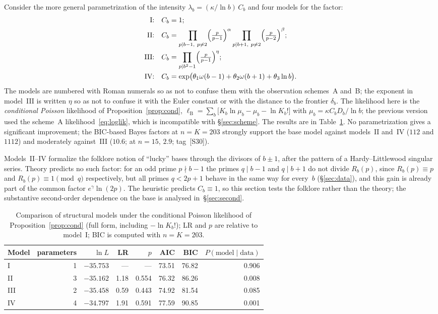 \documentclass[11pt,a4paper]{article}
\theoremstyle{plain}
\theoremstyle{remark}
\newcommand{\Rb}{R_b}
\newcommand{\eg}{e^{\gamma}}
\begin{document}
Consider the more general parametrization of the intensity
$\lambda_b=(\kappa/\ln b)\,C_b$ and four models for the factor:
\begin{align*}
\text{I:}&\quad C_b=1;\\
\text{II:}&\quad C_b=\prod_{p\mid b-1,\ p\ne2}\Bigl(\tfrac{p}{p-1}\Bigr)^{\alpha}
                 \prod_{p\mid b+1,\ p\ne2}\Bigl(\tfrac{p}{p-2}\Bigr)^{\beta};\\
\text{III:}&\quad C_b=\prod_{p\mid b^2-1}\Bigl(\tfrac{p}{p-1}\Bigr)^{\eta};\\
\text{IV:}&\quad C_b=\exp\bigl(\theta_1\omega(b-1)+\theta_2\omega(b+1)+\theta_3\ln b\bigr).
\end{align*}
The models are numbered with Roman numerals so as not to confuse them with the
observation schemes~A and~B; the exponent in model~III is written $\eta$ so as
not to confuse it with the Euler constant or with the distance to the frontier
$\delta_b$. The likelihood here is the \emph{conditional
Poisson} likelihood of Proposition~\ref{prop:cond},
$\ell_{\mathrm B}=\sum_b\bigl[K_b\ln\mu_b-\mu_b-\ln K_b!\bigr]$ with
$\mu_b=\kappa C_b D_b/\ln b$; the previous version used the scheme~A
likelihood~\eqref{eq:loglik}, which is incompatible with \S\ref{sec:scheme}. The
results are in Table~\ref{tab:struct}. No parametrization gives a significant
improvement; the BIC-based Bayes factors at $n=K=203$ strongly support the base
model against models~II and~IV ($112$ and $1112$) and moderately against~III
($10.6$; at $n=15$, $2.9$; tag~[S30]).

Models~II--IV formalize the folklore notion of ``lucky'' bases through the
divisors of $b\pm1$, after the pattern of a Hardy--Littlewood singular series.
Theory predicts no such factor: for an odd prime $p\nmid b-1$ the primes
$q\mid b-1$ and $q\mid b+1$ do not divide $\Rb(p)$, since $\Rb(p)\equiv p$ and $\Rb(p)\equiv1\pmod q$ respectively, but all
primes $q<2p+1$ behave in the same way for every~$b$ (\S\ref{sec:data}), and this
gain is already part of the common factor $\eg\ln(2p)$. The heuristic predicts
$C_b\equiv1$, so this section tests the folklore rather than the theory; the
substantive second-order dependence on the base is analysed
in~\S\ref{sec:second}.

\begin{table}[t]
\centering
\caption{Comparison of structural models under the conditional Poisson likelihood of
Proposition~\ref{prop:cond} (full form, including $-\ln K_b!$); LR and $p$ are
relative to model~I; BIC is computed with $n=K=203$.}
\label{tab:struct}
\small
\begin{tabular}{lrrrrrrr}
\toprule
Model & parameters & $\ln L$ & LR & $p$ & AIC & BIC & $P(\text{model}\mid\text{data})$\\
\midrule
I & 1 & $-35.753$ & --- & --- & 73.51 & 76.82 & 0.906\\
II & 3 & $-35.162$ & 1.18 & 0.554 & 76.32 & 86.26 & 0.008\\
III & 2 & $-35.458$ & 0.59 & 0.443 & 74.92 & 81.54 & 0.085\\
IV & 4 & $-34.797$ & 1.91 & 0.591 & 77.59 & 90.85 & 0.001\\
\bottomrule
\end{tabular}
\end{table}
\end{document}
